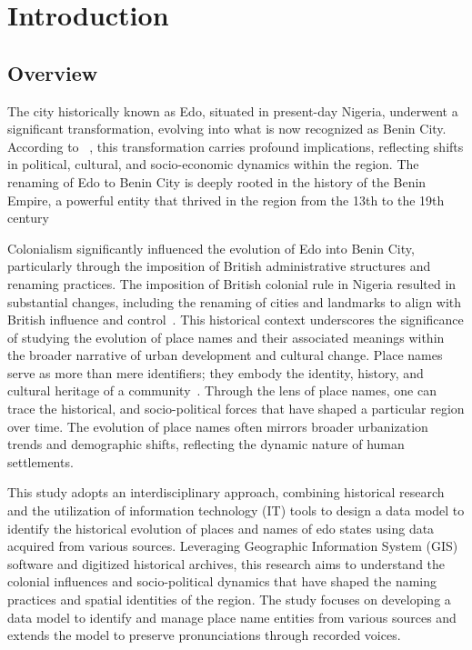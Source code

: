 \chapter{Introduction}
\section{Overview}
The city historically known as Edo, situated in present-day Nigeria, underwent a significant transformation, evolving into what is now recognized as Benin City. According to ~\cite{Michael2023}, this transformation carries profound implications, reflecting shifts in political, cultural, and socio-economic dynamics within the region. The renaming of Edo to Benin City is deeply rooted in the history of the Benin Empire, a powerful entity that thrived in the region from the 13th to the 19th century~\cite{egharevba1968short} 

Colonialism significantly influenced the evolution of Edo into Benin City, particularly through the imposition of British administrative structures and renaming practices. The imposition of British colonial rule in Nigeria resulted in substantial changes, including the renaming of cities and landmarks to align with British influence and control~\cite{falola2008history}. This historical context underscores the significance of studying the evolution of place names and their associated meanings within the broader narrative of urban development and cultural change.
Place names serve as more than mere identifiers; they embody the identity, history, and cultural heritage of a community~\cite{Gelling}. Through the lens of place names, one can trace the historical, and socio-political forces that have shaped a particular region over time. The evolution of place names often mirrors broader urbanization trends and demographic shifts, reflecting the dynamic nature of human settlements.

This study adopts an interdisciplinary approach, combining historical research and the utilization of information technology (IT) tools to design a data model to identify the historical evolution of places and names of edo states using data acquired from various sources. Leveraging Geographic Information System (GIS) software and digitized historical archives, this research aims to understand the colonial influences and socio-political dynamics that have shaped the naming practices and spatial identities of the region. The study focuses on developing a data model to identify and manage place name entities from various sources and extends the model to preserve pronunciations through recorded voices.

